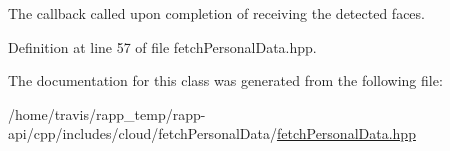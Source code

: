 The callback called upon completion of receiving the detected faces. 



Definition at line 57 of file fetch\-Personal\-Data.\-hpp.



The documentation for this class was generated from the following file\-:\begin{DoxyCompactItemize}
\item 
/home/travis/rapp\-\_\-temp/rapp-\/api/cpp/includes/cloud/fetch\-Personal\-Data/\hyperlink{fetchPersonalData_8hpp}{fetch\-Personal\-Data.\-hpp}\end{DoxyCompactItemize}
